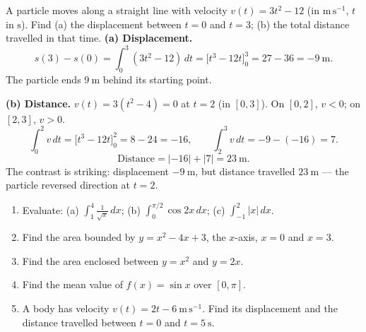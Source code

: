 \documentclass[11pt]{article}
\begin{document}
\begin{exoresolu}
A particle moves along a straight line with velocity $v(t) = 3t^2 - 12$ (in $\mathrm{m\,s^{-1}}$, $t$ in $\mathrm{s}$). Find (a) the displacement between $t = 0$ and $t = 3$; (b) the total distance travelled in that time.
\tcblower
\textbf{(a) Displacement.}
\[
s(3) - s(0) = \int_0^3 (3t^2 - 12)\,dt = \Big[t^3 - 12t\Big]_0^3 = 27 - 36 = -9\ \mathrm{m}.
\]
The particle ends $9\ \mathrm{m}$ behind its starting point.

\textbf{(b) Distance.} $v(t) = 3(t^2 - 4) = 0$ at $t = 2$ (in $[0,3]$). On $[0,2]$, $v < 0$; on $[2,3]$, $v > 0$.
\[
\int_0^2 v\,dt = \Big[t^3 - 12t\Big]_0^2 = 8 - 24 = -16, \qquad
\int_2^3 v\,dt = -9 - (-16) = 7.
\]
\[
\text{Distance} = |-16| + |7| = 23\ \mathrm{m}.
\]
The contrast is striking: displacement $-9\ \mathrm{m}$, but distance travelled $23\ \mathrm{m}$ — the particle reversed direction at $t = 2$.
\end{exoresolu}

\begin{exercice}[Consolidation]
\begin{enumerate}
\item Evaluate: (a) $\displaystyle\int_1^4 \frac{1}{\sqrt{x}}\,dx$; (b) $\displaystyle\int_0^{\pi/2} \cos 2x\,dx$; (c) $\displaystyle\int_{-1}^2 |x|\,dx$.
\item Find the area bounded by $y = x^2 - 4x + 3$, the $x$-axis, $x = 0$ and $x = 3$.
\item Find the area enclosed between $y = x^2$ and $y = 2x$.
\item Find the mean value of $f(x) = \sin x$ over $[0, \pi]$.
\item A body has velocity $v(t) = 2t - 6\ \mathrm{m\,s^{-1}}$. Find its displacement and the distance travelled between $t = 0$ and $t = 5\ \mathrm{s}$.
\end{enumerate}
\end{exercice}
\end{document}
